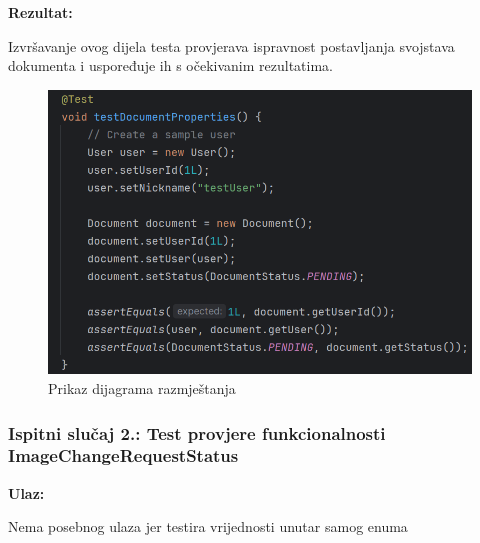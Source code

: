                         \noindent\textbf{Rezultat:}
                        \begin{packed_item}
                        	\item  Izvršavanje ovog dijela testa provjerava ispravnost postavljanja svojstava dokumenta i uspoređuje ih s očekivanim rezultatima.
                        \end{packed_item}
                       \begin{figure} [H]
                       	\centering
                       	\includegraphics[width=0.7\linewidth]{slike/DokumentTest.png}
                       	\caption{Prikaz dijagrama razmještanja}
                       	\label{fig:Prikaz dijagrama razmještanja}
                       \end{figure}
                      



            \subsubsection{Ispitni slučaj 2.: Test provjere funkcionalnosti ImageChangeRequestStatus}

                                    \noindent\textbf{Ulaz:}
                                    \begin{packed_item}
                                    	\item Nema posebnog ulaza jer testira vrijednosti unutar samog enuma
                                    \end{packed_item}
                      
